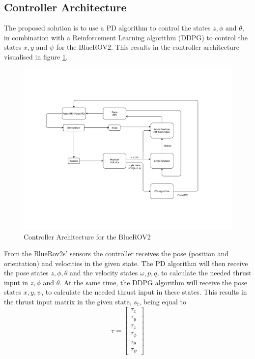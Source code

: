 \subsection{Controller Architecture}
The proposed solution is to use a PD algorithm to control the states $z, \phi$ and $\theta$, in combination with a Reinforcement Learning algorithm (DDPG) to control the states $x, y$ and $\psi$ for the BlueROV2. This results in the controller architecture visualised in figure \ref{fig:architecture}. 
\begin{figure}[H]
    \centering
    \includegraphics[width=\textwidth, trim={1cm 4cm 1cm 3cm},clip]{images/chap4/architecture.pdf}
    \caption{Controller Architecture for the BlueROV2}
    \label{fig:architecture}
\end{figure}
From the BlueRov2s' sensors the controller receives the pose (position and orientation) and velocities in the given state. The PD algorithm will then receive the pose states $z, \phi, \theta$ and the velocity states $\omega, p, q$, to calculate the needed thrust input in $z, \phi$ and $\theta$. At the same time, the DDPG algorithm will receive the pose states $x, y, \psi$, to calculate the needed thrust input in these states. This results in the thrust input matrix in the given state, $s_{t}$, being equal to
\begin{equation}
    \tau = \begin{bmatrix}
    \tau_{x} \\ \tau_{y} \\ \tau_{z} \\ \tau_{\phi} \\ \tau_{\theta} \\ \tau_{\psi}
    \end{bmatrix}
\end{equation}
